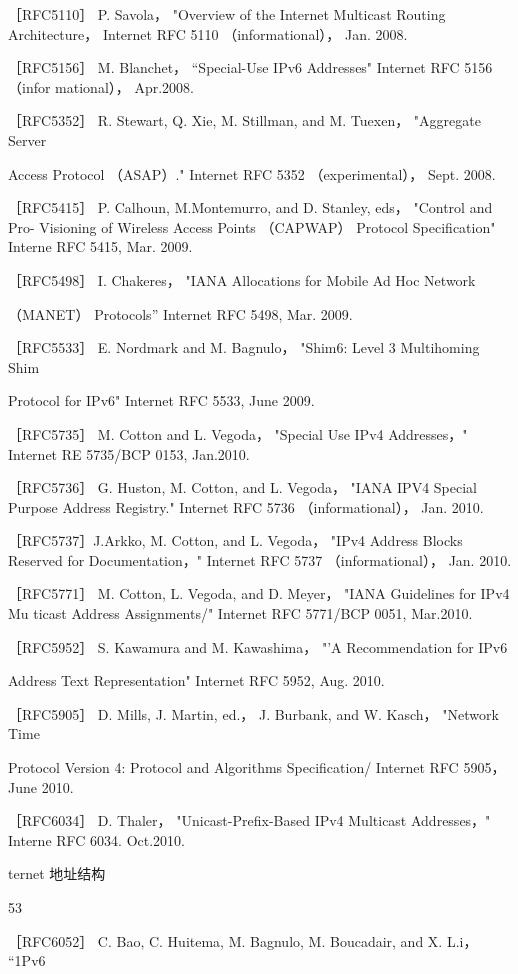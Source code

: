 ［RFC5110］ P. Savola， "Overview of the Internet Multicast Routing Architecture，
Internet RFC 5110 （informational）， Jan. 2008.

［RFC5156］ M. Blanchet， “Special-Use IPv6 Addresses" Internet RFC 5156 （infor
mational）， Apr.2008.

［RFC5352］ R. Stewart, Q. Xie, M. Stillman, and M. Tuexen， "Aggregate Server

Access Protocol （ASAP）." Internet RFC 5352 （experimental）， Sept. 2008.

［RFC5415］ P. Calhoun, M.Montemurro, and D. Stanley, eds， "Control and Pro-
Visioning of Wireless Access Points （CAPWAP） Protocol Specification" Interne
RFC 5415, Mar. 2009.

［RFC5498］ I. Chakeres， "IANA Allocations for Mobile Ad Hoc Network

（MANET） Protocols” Internet RFC 5498, Mar. 2009.

［RFC5533］ E. Nordmark and M. Bagnulo， "Shim6: Level 3 Multihoming Shim

Protocol for IPv6" Internet RFC 5533, June 2009.

［RFC5735］ M. Cotton and L. Vegoda， "Special Use IPv4 Addresses，" Internet RE
5735/BCP 0153, Jan.2010.

［RFC5736］ G. Huston, M. Cotton, and L. Vegoda， "IANA IPV4 Special Purpose
Address Registry." Internet RFC 5736 （informational）， Jan. 2010.

［RFC5737］J.Arkko, M. Cotton, and L. Vegoda， "IPv4 Address Blocks Reserved
for Documentation，" Internet RFC 5737 （informational）， Jan. 2010.

［RFC5771］ M. Cotton, L. Vegoda, and D. Meyer， "IANA Guidelines for IPv4 Mu
ticast Address Assignments/" Internet RFC 5771/BCP 0051, Mar.2010.

［RFC5952］ S. Kawamura and M. Kawashima， "'A Recommendation for IPv6

Address Text Representation" Internet RFC 5952, Aug. 2010.

［RFC5905］ D. Mills, J. Martin, ed.， J. Burbank, and W. Kasch， "Network Time

Protocol Version 4: Protocol and Algorithms Specification/ Internet RFC 5905，
June 2010.

［RFC6034］ D. Thaler， "Unicast-Prefix-Based IPv4 Multicast Addresses，" Interne
RFC 6034. Oct.2010.

ternet 地址结构

53

［RFC6052］ C. Bao, C. Huitema, M. Bagnulo, M. Boucadair, and X. L.i， “1Pv6

